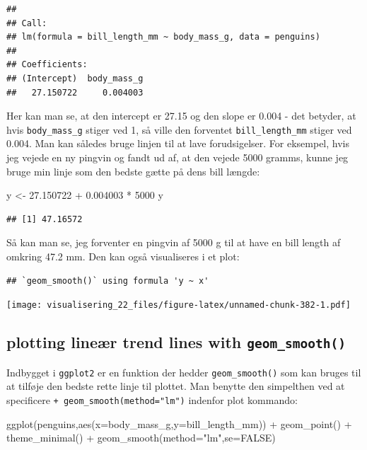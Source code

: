 \documentclass[
]{book}
\newenvironment{Shaded}{\begin{snugshade}}{\end{snugshade}}
\newcommand{\AttributeTok}[1]{\textcolor[rgb]{0.77,0.63,0.00}{#1}}
\newcommand{\ConstantTok}[1]{\textcolor[rgb]{0.00,0.00,0.00}{#1}}
\newcommand{\DecValTok}[1]{\textcolor[rgb]{0.00,0.00,0.81}{#1}}
\newcommand{\FloatTok}[1]{\textcolor[rgb]{0.00,0.00,0.81}{#1}}
\newcommand{\FunctionTok}[1]{\textcolor[rgb]{0.00,0.00,0.00}{#1}}
\newcommand{\NormalTok}[1]{#1}
\newcommand{\OtherTok}[1]{\textcolor[rgb]{0.56,0.35,0.01}{#1}}
\newcommand{\SpecialCharTok}[1]{\textcolor[rgb]{0.00,0.00,0.00}{#1}}
\newcommand{\StringTok}[1]{\textcolor[rgb]{0.31,0.60,0.02}{#1}}
\begin{document}
\begin{verbatim}
## 
## Call:
## lm(formula = bill_length_mm ~ body_mass_g, data = penguins)
## 
## Coefficients:
## (Intercept)  body_mass_g  
##   27.150722     0.004003
\end{verbatim}

Her kan man se, at den intercept er 27.15 og den slope er 0.004 - det betyder, at hvis \texttt{body\_mass\_g} stiger ved 1, så ville den forventet \texttt{bill\_length\_mm} stiger ved 0.004. Man kan således bruge linjen til at lave forudsigelser. For eksempel, hvis jeg vejede en ny pingvin og fandt ud af, at den vejede 5000 gramms, kunne jeg bruge min linje som den bedste gætte på dens bill længde:

\begin{Shaded}
\begin{Highlighting}[]
\NormalTok{y }\OtherTok{\textless{}{-}} \FloatTok{27.150722} \SpecialCharTok{+} \FloatTok{0.004003}  \SpecialCharTok{*} \DecValTok{5000}
\NormalTok{y}
\end{Highlighting}
\end{Shaded}

\begin{verbatim}
## [1] 47.16572
\end{verbatim}

Så kan man se, jeg forventer en pingvin af 5000 g til at have en bill length af omkring 47.2 mm. Den kan også visualiseres i et plot:

\begin{verbatim}
## `geom_smooth()` using formula 'y ~ x'
\end{verbatim}

\texttt{[image: visualisering\_22\_files/figure-latex/unnamed-chunk-382-1.pdf]}

\hypertarget{plotting-lineuxe6r-trend-lines-with-geom_smooth}{%
\subsection{\texorpdfstring{plotting lineær trend lines with \texttt{geom\_smooth()}}{plotting lineær trend lines with geom\_smooth()}}\label{plotting-lineuxe6r-trend-lines-with-geom_smooth}}

Indbygget i \texttt{ggplot2} er en funktion der hedder \texttt{geom\_smooth()} som kan bruges til at tilføje den bedste rette linje til plottet. Man benytte den simpelthen ved at specificere \texttt{+\ geom\_smooth(method="lm")} indenfor plot kommando:

\begin{Shaded}
\begin{Highlighting}[]
\FunctionTok{ggplot}\NormalTok{(penguins,}\FunctionTok{aes}\NormalTok{(}\AttributeTok{x=}\NormalTok{body\_mass\_g,}\AttributeTok{y=}\NormalTok{bill\_length\_mm)) }\SpecialCharTok{+} 
  \FunctionTok{geom\_point}\NormalTok{() }\SpecialCharTok{+} 
  \FunctionTok{theme\_minimal}\NormalTok{() }\SpecialCharTok{+} 
  \FunctionTok{geom\_smooth}\NormalTok{(}\AttributeTok{method=}\StringTok{"lm"}\NormalTok{,}\AttributeTok{se=}\ConstantTok{FALSE}\NormalTok{)}
\end{Highlighting}
\end{Shaded}
\end{document}
